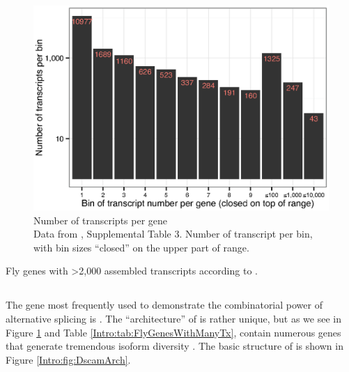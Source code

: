     \begin{figure} %
      \centering
      \includegraphics{Figures/Intro/NumberOFTranscriptsPerFlyGene.eps}
      \caption[Number of transcripts per \flies{} gene]
      {
        Number of transcripts per \flies{} gene\\[0.25cm]
        Data from \citep{Brown2014}, Supplemental Table 3. Number of transcript per bin, with bin sizes ``closed'' on the upper part of range.
        }
      \label{Intro:fig:txPerFlyGene}
      \end{figure}

    \begin{table} %
      \caption{Fly genes with >2,000 assembled transcripts according to \citep{Brown2014}.}
      \label{Intro:tab:FlyGenesWithManyTx}
      
      \end{table}

  \subsection{\flies{} \dscam{}}
    \label{Intro:subsec:Dscam}

    The gene most frequently used to demonstrate the combinatorial power of alternative splicing is \flies{} \dscam{}. The ``architecture'' of \dscam{} is rather unique, but as we see in Figure \ref{Intro:fig:txPerFlyGene} and Table \ref{Intro:tab:FlyGenesWithManyTx}, \flies{} contain numerous genes that generate tremendous isoform diversity \citep{Brown2014}. The basic structure of \dscam{} is shown in Figure \ref{Intro:fig:DscamArch}.

